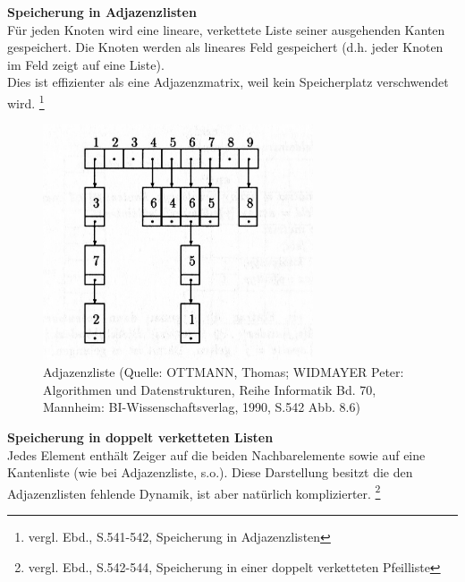 \textbf{Speicherung in Adjazenzlisten}\\
Für jeden Knoten wird eine lineare, verkettete Liste seiner ausgehenden Kanten gespeichert.
Die Knoten werden als lineares Feld gespeichert (d.h. jeder Knoten im Feld zeigt auf eine Liste). \\
Dies ist effizienter als eine Adjazenzmatrix, weil kein Speicherplatz verschwendet wird.
 \footnote{vergl. Ebd., S.541-542, Speicherung in Adjazenzlisten} \\

\begin{figure}[h]
\centering
\includegraphics[width = 8cm]{./chapters/adjazenzliste.jpg}
\caption{Adjazenzliste {\tiny (Quelle: OTTMANN, Thomas; WIDMAYER Peter: Algorithmen und Datenstrukturen, Reihe Informatik Bd. 70, Mannheim: BI-Wissenschaftsverlag, 1990, S.542 Abb. 8.6)} }
\label{a3}
\end{figure} 

\textbf{Speicherung in doppelt verketteten Listen}\\
Jedes Element enthält Zeiger auf die beiden Nachbarelemente sowie auf eine Kantenliste (wie bei Adjazenzliste, s.o.).
Diese Darstellung besitzt die den Adjazenzlisten fehlende Dynamik, ist aber natürlich komplizierter.
 \footnote{vergl. Ebd., S.542-544, Speicherung in einer doppelt verketteten Pfeilliste}
 
